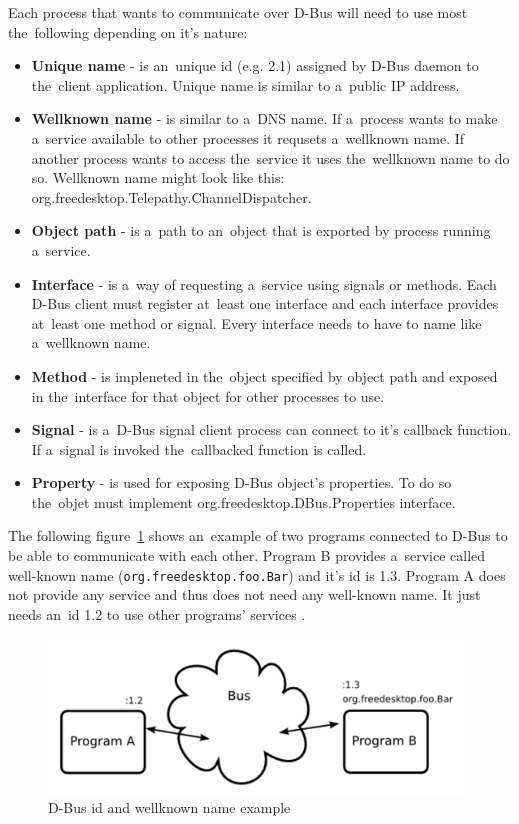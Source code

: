 Each process that wants to communicate over D-Bus will need to use most the~following depending on it's nature: 
\begin{itemize}
	\item {\bf Unique name} - is an~unique id (e.g. 2.1) assigned by D-Bus daemon to the~client application. Unique name is similar to a~public IP address.
	\item {\bf Wellknown name} - is similar to a~DNS name. If a~process wants to make a~service available to other processes it requsets a~wellknown name. If another process wants to access the~service it uses the~wellknown name to do so. Wellknown name might look like this: org.freedesktop.Telepathy.ChannelDispatcher.    
	\item {\bf Object path} - is a~path to an~object that is exported by process running a~service.
	\item {\bf Interface} - is a~way of requesting a~service using signals or methods. Each D-Bus client must register at~least one interface and each interface provides at~least one method or signal. Every interface needs to have to name like a~wellknown name.  
	\item {\bf Method} - is impleneted in the~object specified by object path and exposed in the~interface for that object for other processes to use. 
	\item {\bf Signal} - is a~D-Bus signal client process can connect to it's callback function. If a~signal is invoked the~callbacked function is called.
	\item {\bf Property} - is used for exposing D-Bus object's properties. To do so the~objet must implement org.freedesktop.DBus.Properties interface.
\end{itemize}

The following figure~\ref{fig:dbusArchitectureNames} shows an~example of two programs connected to D-Bus to be able to communicate with each other. Program B provides a~service called well-known name (\verb|org.freedesktop.foo.Bar|) and it's id is 1.3. Program A does not provide any service and thus does not need any well-known name. It just needs an~id 1.2 to use other programs' services \cite{TPWiki}.

\begin{figure}[ht]
\begin{center}
	\includegraphics[width=11cm]{fig/dbus-architecture-names.png}
	\caption{D-Bus id and wellknown name example \cite{TPWiki}}
	\label{fig:dbusArchitectureNames}
\end{center}
\end{figure}



